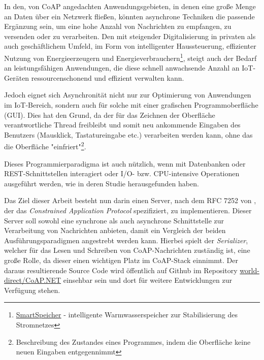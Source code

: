 In den, von CoAP angedachten Anwendungsgebieten, in denen eine große Menge an Daten über ein Netzwerk fließen, könnten asynchrone Techniken die passende Ergänzung sein, um eine hohe Anzahl von Nachrichten zu empfangen, zu versenden oder zu verarbeiten. Den mit steigender Digitalisierung in privaten als auch geschäftlichem Umfeld, im Form von intelligenter Haussteuerung, effizienter Nutzung von Energieerzeugern und Energieverbrauchern\footnote{\href{https://www.a1energysolutions.at/smartspeicher/}{SmartSpeicher} - intelligente Warmwasserspeicher zur Stabilisierung des Stromnetzes}, steigt auch der Bedarf an leistungsfähigen Anwendungen, die diese schnell anwachsende Anzahl an IoT-Geräten ressourcenschonend und effizient verwalten kann. 

Jedoch eignet sich Asynchronität nicht nur zur Optimierung von Anwendungen im IoT-Bereich, sondern auch für solche mit einer grafischen Programmoberfläche (GUI). Dies hat den Grund, da der für das Zeichnen der Oberfläche verantwortliche Thread freibleibt und somit neu ankommende Eingaben des Benutzers (Mausklick, Tastatureingabe etc.) verarbeiten werden kann, ohne das die Oberfläche "einfriert"\footnote{Beschreibung des Zustandes eines Programmes, indem die Oberfläche keine neuen Eingaben entgegennimmt}.

Dieses Programmierparadigma ist auch nützlich, wenn mit Datenbanken oder REST-Schnittstellen interagiert oder I/O- bzw. CPU-intensive Operationen ausgeführt werden, wie \citeauthor{okur2014study} in deren Studie  \autocite{okur2014study} herausgefunden haben.

Das Ziel dieser Arbeit besteht nun darin einen Server, nach dem RFC 7252 von \citeauthor{RFC7252} \autocite{RFC7252}, der das \textit{Constrained Application Protocol} spezifiziert, zu implementieren. Dieser Server soll sowohl eine synchrone als auch asynchrone Schnittstelle zur Verarbeitung von Nachrichten anbieten, damit ein Vergleich der beiden Ausführungsparadigmen angestrebt werden kann. Hierbei spielt der \textit{Serializer}, welcher für das Lesen und Schreiben von CoAP-Nachrichten zuständig ist, eine große Rolle, da dieser einen wichtigen Platz im CoAP-Stack einnimmt. Der daraus resultierende Source Code wird öffentlich auf Github im Repository \href{https://github.com/world-direct/CoAP.NET}{world-direct/CoAP.NET} einsehbar sein und dort für weitere Entwicklungen zur Verfügung stehen.